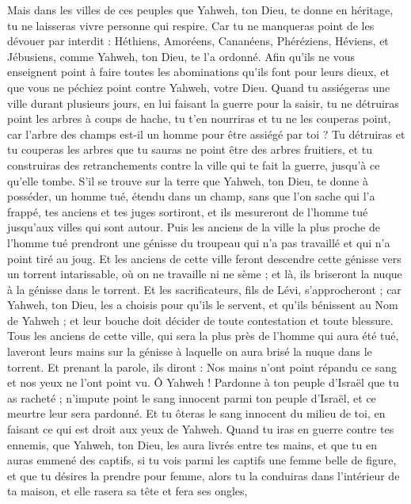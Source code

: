 \begin{multicols}{2}
Mais dans les villes de ces peuples que Yahweh, ton Dieu, te donne en héritage, tu ne laisseras vivre personne qui respire.
Car tu ne manqueras point de les dévouer par interdit : Héthiens, Amoréens, Cananéens, Phéréziens, Héviens, et Jébusiens, comme Yahweh, ton Dieu, te l'a ordonné.
Afin qu'ils ne vous enseignent point à faire toutes les abominations qu'ils font pour leurs dieux, et que vous ne péchiez point contre Yahweh, votre Dieu.
Quand tu assiégeras une ville durant plusieurs jours, en lui faisant la guerre pour la saisir, tu ne détruiras point les arbres à coups de hache, tu t’en nourriras et tu ne les couperas point, car l'arbre des champs est-il un homme pour être assiégé par toi ?
Tu détruiras et tu couperas les arbres que tu sauras ne point être des arbres fruitiers, et tu construiras des retranchements contre la ville qui te fait la guerre, jusqu'à ce qu'elle tombe.
\VerseOne{}S’il se trouve sur la terre que Yahweh, ton Dieu, te donne à posséder, un homme tué, étendu dans un champ, sans que l’on sache qui l’a frappé,
tes anciens et tes juges sortiront, et ils mesureront de l’homme tué jusqu'aux villes qui sont autour.
Puis les anciens de la ville la plus proche de l'homme tué prendront une génisse du troupeau qui n’a pas travaillé et qui n'a point tiré au joug.
Et les anciens de cette ville feront descendre cette génisse vers un torrent intarissable, où on ne travaille ni ne sème ; et là, ils briseront la nuque à la génisse dans le torrent.
Et les sacrificateurs, fils de Lévi, s'approcheront ; car Yahweh, ton Dieu, les a choisis pour qu’ils le servent, et qu’ils bénissent au Nom de Yahweh ; et leur bouche doit décider de toute contestation et toute blessure.
Tous les anciens de cette ville, qui sera la plus près de l'homme qui aura été tué, laveront leurs mains sur la génisse à laquelle on aura brisé la nuque dans le torrent.
Et prenant la parole, ils diront : Nos mains n'ont point répandu ce sang et nos yeux ne l'ont point vu.
Ô Yahweh ! Pardonne à ton peuple d'Israël que tu as racheté ; n’impute point le sang innocent parmi ton peuple d'Israël, et ce meurtre leur sera pardonné.
Et tu ôteras le sang innocent du milieu de toi, en faisant ce qui est droit aux yeux de Yahweh.
Quand tu iras en guerre contre tes ennemis, que Yahweh, ton Dieu, les aura livrés entre tes mains, et que tu en auras emmené des captifs,
si tu vois parmi les captifs une femme belle de figure, et que tu désires la prendre pour femme,
alors tu la conduiras dans l’intérieur de ta maison, et elle rasera sa tête et fera ses ongles,

\end{multicols}
